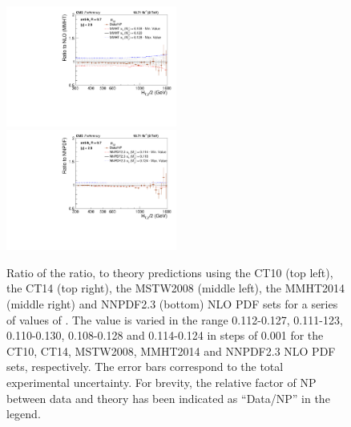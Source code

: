 \begin{figure}[!htbp]
\begin{center}
    \includegraphics[width=0.5\textwidth]{Plots_HT_2_150/Sensitivity_Pdfs/Sensitivity_double_ratio_32_MMHT2014.pdf}\\
    \includegraphics[width=0.5\textwidth]{Plots_HT_2_150/Sensitivity_Pdfs/Sensitivity_double_ratio_32_NNPDF23.pdf}
    \caption{Ratio of the ratio, \ratio to theory predictions using the CT10 (top left), the CT14 (top right),
      the MSTW2008 (middle left), the MMHT2014 (middle right) and NNPDF2.3 (bottom) NLO PDF sets for a 
      series of values of \alpsmz. The \alpsmz value is varied in the range 0.112-0.127, 0.111-123, 0.110-0.130, 0.108-0.128 and 0.114-0.124 in steps of 0.001 for the CT10, CT14, MSTW2008, MMHT2014 and NNPDF2.3 NLO PDF sets, respectively. The error bars correspond to the total experimental uncertainty. For brevity, the relative factor of NP 
      between data and theory has been indicated as ``Data/NP'' in
      the legend.}
    \label{fig:sensitivity_double_ratio}
  \end{center}
\end{figure}

